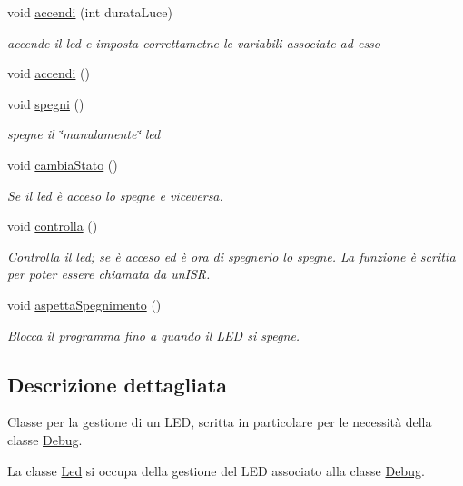 \begin{DoxyCompactItemize}
void \hyperlink{class_led_a9fa1c8ec9236183ad84924b4a7f5649c}{accendi} (int durata\+Luce)
\begin{DoxyCompactList}\small\item\em accende il led e imposta correttametne le variabili associate ad esso \end{DoxyCompactList}\item 
void \hyperlink{class_led_aeb8ef9393b6894e5fa78d2534e7a5b5e}{accendi} ()
\item 
void \hyperlink{class_led_a7c9cdfb5a31aff4dfd8199b664b390cc}{spegni} ()
\begin{DoxyCompactList}\small\item\em spegne il \char`\"{}manulamente\char`\"{} led \end{DoxyCompactList}\item 
void \hyperlink{class_led_a9167b7276efcab472e1bb9cd4c1b872d}{cambia\+Stato} ()
\begin{DoxyCompactList}\small\item\em Se il led è acceso lo spegne e viceversa. \end{DoxyCompactList}\item 
void \hyperlink{class_led_a8116c9d51b79f93663549ade9606fd76}{controlla} ()
\begin{DoxyCompactList}\small\item\em Controlla il led; se è acceso ed è ora di spegnerlo lo spegne. La funzione è scritta per poter essere chiamata da un\textquotesingle{}I\+SR. \end{DoxyCompactList}\item 
void \hyperlink{class_led_ab7bd0e357df0672c48ad791be7785442}{aspetta\+Spegnimento} ()
\begin{DoxyCompactList}\small\item\em Blocca il programma fino a quando il L\+ED si spegne. \end{DoxyCompactList}\end{DoxyCompactItemize}


\subsection{Descrizione dettagliata}
Classe per la gestione di un L\+ED, scritta in particolare per le necessità della classe \hyperlink{class_debug}{Debug}. 

La classe {\ttfamily \hyperlink{class_led}{Led}} si occupa della gestione del L\+ED associato alla classe \hyperlink{class_debug}{Debug}. 

